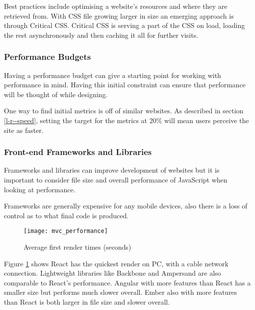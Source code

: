 Best practices include optimising a website's resources and where they are retrieved from. With CSS file growing larger in size an emerging approach is through Critical CSS. Critical CSS is serving a part of the CSS on load, loading the rest asynchronously and then caching it all for further visits. \cite{fast_as_heck}

\subsubsection{Performance Budgets} \label{l-r--performance-budgets}

Having a performance budget can give a starting point for working with performance in mind. Having this initial constraint can ensure that performance will be thought of while designing. \cite{performance_budget}

One way to find initial metrics is off of similar websites. As described in section \ref{l-r--speed}, setting the target for the metrics at 20\% will mean users perceive the site as faster.

\subsubsection{Front-end Frameworks and Libraries} \label{l-r--frameworks}

Frameworks and libraries can improve development of websites but it is important to consider file size and overall performance of JavaScript when looking at performance.

Frameworks are generally expensive for any mobile devices, also there is a loss of control as to what final code is produced. \cite{cost_of_frameworks}

\begin{figure}[H]
  \centering
    \texttt{[image: mvc\_performance]}
  \caption{Average first render times (seconds) \protect\cite{performance_mvc}}
  \label{figure-average-first-render}
\end{figure}

Figure \ref{figure-average-first-render} shows React has the quickest render on PC, with a cable network connection. Lightweight libraries like Backbone and Ampersand are also comparable to React's performance. Angular with more features than React has a smaller size but performs much slower overall. Ember also with more features than React is both larger in file size and slower overall.

